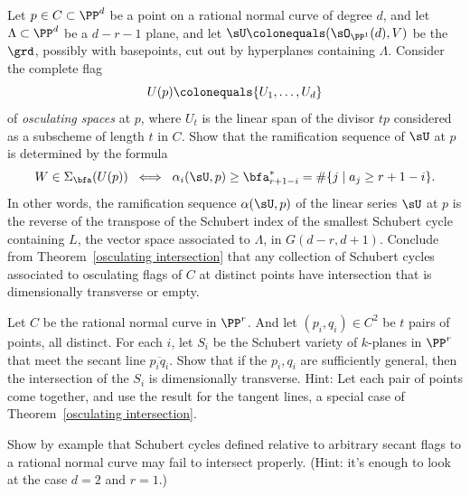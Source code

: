 \begin{exercise}\label{osculating
planes}
Let $p\in C\subset \PP^{d}$ be a point on a rational normal curve of
degree $d$, and
let $\Lambda\subset \PP^{d}$ be a $d-r-1$ plane, and let  $\sU
\colonequals (\sO_{\PP^{1}}(d), V)$
be
the  $\grd$,  possibly with basepoints, cut out by hyperplanes containing
$\Lambda$.
Consider the complete flag
$$
U(p) \colonequals  \{U_{1}, \dots, U_{d}\}
$$
of \emph{osculating spaces} at $p$, where $U_{t}$ is the linear span of
%
the divisor $tp$ considered
as a subscheme of length $t$ in $C$. Show that the ramification sequence
of $\sU$ at $p$
is determined by the formula
$$
W \in \Sigma_{\bfa}(U(p))
\; \iff \; \alpha_i(\sU, p) \geq \bfa^*_{r+1-i} = \#\{j\mid a_j\geq
r+1-i\}.
$$
In other words, the ramification sequence $\alpha(\sU, p)$ of the linear
series $\sU$ at $p$ is the reverse of the transpose of the Schubert
index of the smallest Schubert cycle containing $L$, the vector
space associated to $\Lambda$, in  $G(d-r, d+1)$. Conclude from
Theorem~\ref{osculating intersection}
that any collection of Schubert cycles associated to osculating flags
of $C$ at distinct points have intersection
that is dimensionally transverse or empty.
\end{exercise}

\begin{exercise}\label{independent secants 0}
Let $C$ be the rational normal curve in $\PP^{r}$. And let $(p_{i},
q_{i})\in  C^{2}$ be $t$ pairs of points, all distinct.
For each $i$, let $S_{i}$ be the Schubert variety of $k$-planes in
$\PP^{r}$ that meet the secant line
$\overline{p_{i}q_{i}}$. Show that if the $p_{i}, q_{i}$ are sufficiently
general, then the intersection
of the $S_{i}$ is dimensionally transverse. Hint: Let each pair of points
come together, and use the result
for the tangent lines, a special case of Theorem~\ref{osculating
intersection}.
\end{exercise}

\begin{exercise}\label{only general secants}
Show by example that Schubert cycles defined relative to arbitrary secant
flags to a rational normal curve may fail to intersect properly. (Hint:
it's enough to look at the case $d=2$ and $r=1$.)
\end{exercise}

